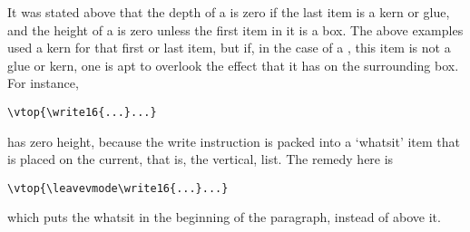 \documentclass{book}
\begin{document}
It was stated above that
the depth of a  is zero if the last item
is a kern or  glue, and the height of a  is
zero unless the first item in it is a box.
The above examples used a kern for that first or last item,
but if, in the case of a ,
this item is not a glue or kern, one is apt to
overlook the effect that it has on the surrounding box.
For instance,
\begin{verbatim}
\vtop{\write16{...}...}
\end{verbatim}
has zero height,
because the write instruction
is packed into a `whatsit' item that is placed on the current,
that is, the vertical, list.
The remedy here is
\begin{verbatim}
\vtop{\leavevmode\write16{...}...}
\end{verbatim}
which puts the whatsit in the beginning of the paragraph,
instead of above it.
\end{document}
